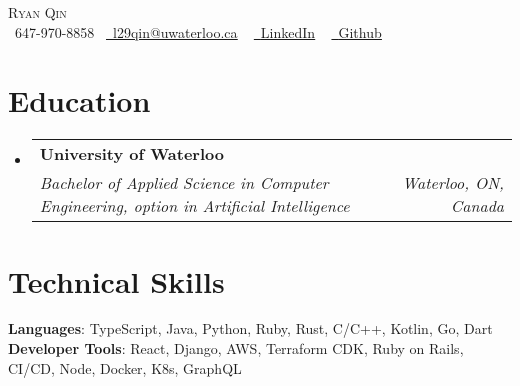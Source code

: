\documentclass[letterpaper,11pt]{article}
\makeatletter
\newcommand{\resumeSubheading}[4]{
  \vspace{-2pt}\item
    \begin{tabular*}{1.0\textwidth}[t]{l@{\extracolsep{\fill}}r}
      \textbf{#1} & \textbf{\small #2} \\
      \textit{\small#3} & \textit{\small #4} \\
    \end{tabular*}\vspace{-7pt}
}
\newcommand{\resumeSubHeadingListStart}{\begin{itemize}[leftmargin=0.0in, label={}]}
\newcommand{\resumeSubHeadingListEnd}{\end{itemize}}
\makeatother
\begin{document}
\begin{center}
    {\Huge \scshape Ryan Qin} \\ \vspace{1pt}
    \small \raisebox{-0.1\height}\faPhone\ 647-970-8858~ \href{l29qin@uwaterloo.ca}{\raisebox{-0.2\height}\faEnvelope\  \underline{l29qin@uwaterloo.ca}} ~ 
    \href{https://www.linkedin.com/in/ryan-qin-4b8157130}{\raisebox{-0.2\height}\faLinkedin\ \underline{LinkedIn}}  ~
    \href{https://github.com/lang98}{\raisebox{-0.2\height}\faGithub\ \underline{Github}}
    \vspace{-8pt}
\end{center}


\section{Education}
  \resumeSubHeadingListStart
    \resumeSubheading
      {University of Waterloo}{}
      {Bachelor of Applied Science in Computer Engineering, option in Artificial Intelligence}{Waterloo, ON, Canada}
  \resumeSubHeadingListEnd

%
\section{Technical Skills}
  \begin{itemize}[leftmargin=0.15in, label={}]
    \small{\item{
      \textbf{Languages}{: TypeScript, Java, Python, Ruby, Rust, C/C++, Kotlin, Go, Dart} \\
      \textbf{Developer Tools}{: React, Django, AWS, Terraform CDK, Ruby on Rails, CI/CD, Node, Docker, K8s, GraphQL} \\
    }}
  \end{itemize}
\vspace{-16pt}

\end{document}
